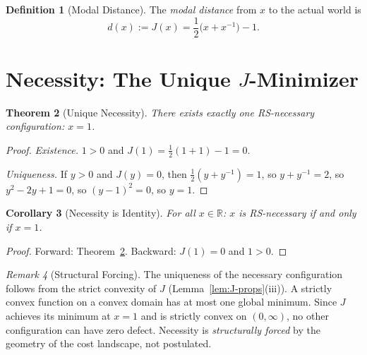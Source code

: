 \documentclass[12pt,a4paper]{article}
\newtheorem{theorem}{Theorem}[section]
\newtheorem{corollary}[theorem]{Corollary}
\theoremstyle{definition}
\newtheorem{definition}[theorem]{Definition}
\theoremstyle{remark}
\newtheorem{remark}[theorem]{Remark}
\begin{document}
\begin{definition}[Modal Distance]
\label{def:distance}
The \emph{modal distance} from $x$ to the actual world is
\begin{equation}
  d(x) := J(x) = \frac{1}{2}\bigl(x + x^{-1}\bigr) - 1.
\end{equation}
\end{definition}

\section{Necessity: The Unique $J$-Minimizer}
\label{sec:necessity}

\begin{theorem}[Unique Necessity]
\label{thm:unique-nec}
There exists exactly one RS-necessary configuration: $x = 1$.
\end{theorem}

\begin{proof}
\textit{Existence.}  $1 > 0$ and $J(1) = \tfrac{1}{2}(1 + 1) - 1 = 0$.

\textit{Uniqueness.}  If $y > 0$ and $J(y) = 0$, then
$\tfrac{1}{2}(y + y^{-1}) = 1$, so $y + y^{-1} = 2$, so
$y^2 - 2y + 1 = 0$, so $(y - 1)^2 = 0$, so $y = 1$.
\end{proof}

\begin{corollary}[Necessity is Identity]
\label{cor:nec-one}
For all $x \in \mathbb{R}$: $x$ is RS-necessary if and only if $x = 1$.
\end{corollary}

\begin{proof}
Forward: Theorem~\ref{thm:unique-nec}.  Backward: $J(1) = 0$ and
$1 > 0$.
\end{proof}

\begin{remark}[Structural Forcing]
\label{rem:forcing}
The uniqueness of the necessary configuration follows from the strict
convexity of $J$ (Lemma~\ref{lem:J-props}(iii)).  A strictly convex
function on a convex domain has at most one global minimum.  Since $J$
achieves its minimum at $x = 1$ and is strictly convex on
$(0, \infty)$, no other configuration can have zero defect.  Necessity
is \emph{structurally forced} by the geometry of the cost landscape, not
postulated.
\end{remark}

\end{document}
